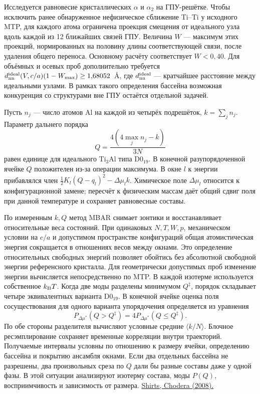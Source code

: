 \documentclass[11pt,a4paper]{article}
\begin{document}
Исследуется равновесие кристаллических \(\alpha\) и \(\alpha_2\) на
ГПУ-решётке. Чтобы исключить ранее обнаруженное нефизическое сближение
Ti--Ti у исходного MTP, для каждого атома ограничена проекция смещения
от идеального узла вдоль каждой из 12 ближайших связей ГПУ. Величина
\(W\) --- максимум этих проекций, нормированных на половину длины соответствующей связи,
после удаления общего переноса. Основному расчёту соответствует
\(W<0{,}40\). Для объёмных и осевых проб дополнительно требуется
\(d_{\rm nn}^{\rm ideal}(V,c/a)(1-W_{\max})\ge1{,}68052\)~\AA,
где \(d_{\rm nn}^{\rm ideal}\) --- кратчайшее расстояние между идеальными узлами.
В рамках такого определения бассейна возможная конкуренция
со структурами вне ГПУ остаётся отдельной задачей.

Пусть \(n_j\) --- число атомов Al на каждой из четырёх подрешёток,
\(k=\sum_jn_j\). Параметр дальнего порядка
\[
 Q=\frac{4(4\max_j n_j-k)}{3N}
\]
равен единице для идеального Ti$_3$Al типа D0$_{19}$. В конечной
разупорядоченной ячейке \(Q\) положителен из-за операции максимума.
В окне \(l\) к энергии прибавлялся член
\(\frac12 K_l(Q-q_l)^2-\Delta\mu_l k\).
Химическое поле \(\Delta\mu_l\) относится к конфигурационной замене;
пересчёт к физическим массам даёт общий сдвиг поля при данной
температуре и сохраняет равновесные составы.

По измеренным \(k,Q\) метод MBAR снимает зонтики и восстанавливает
относительные веса состояний. При одинаковых \(N,T,W,p\), механическом
условии на \(c/a\) и допустимом пространстве конфигураций общая
атомистическая энергия сокращается в отношениях весов между окнами.
Это определение относительных свободных энергий позволяет обойтись
без абсолютной свободной энергии референсного кристалла. Для геометрически
допустимых проб изменение энергии вычисляется непосредственно по MTP. В каждой
изотерме используется собственное \(k_{\rm B}T\).
Когда две моды разделены минимумом \(Q^\ddagger\), порядок складывает
четыре эквивалентных варианта D0$_{19}$. В конечной ячейке оценка поля
сосуществования для одного варианта упорядочения определяется из уравнения
\[
 P_{\Delta\mu^*}(Q>Q^\ddagger)=4P_{\Delta\mu^*}(Q\le Q^\ddagger).
\]
По обе стороны разделителя вычисляют условные средние
\(\langle k/N\rangle\). Блочное ресэмплирование сохраняет временные
корреляции внутри траекторий. Получаемые интервалы условны по отношению
к размеру ячейки, определению бассейна и покрытию ансамбля окнами.
Если два отдельных бассейна не разрешены, два произвольных среза по \(Q\)
дали бы разные составы даже у одной фазы. В этой ситуации анализируют
изотерму состава, моды \(P(Q)\), восприимчивость и зависимость от размера.
\href{https://doi.org/10.1063/1.2978177}{Shirts, Chodera (2008).}
\end{document}
